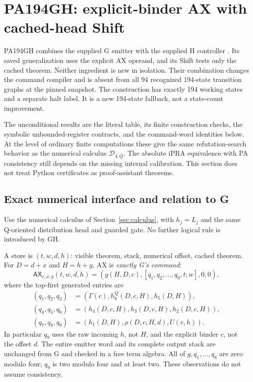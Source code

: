 \section{PA194GH: explicit-binder AX with cached-head Shift}
\label{sec:pa194gh-new}

PA194GH combines the supplied G emitter with the supplied H controller
\cite{generalizer,h-parent}.
Its saved generalization uses the explicit AX operand, and its Shift
tests only the cached theorem. Neither ingredient is new in isolation.
Their combination changes the command compiler and is absent from all
94 recognized 194-state transition graphs at the pinned snapshot.
The construction has exactly 194 working states and a separate halt label.
It is a new 194-state fallback, not a state-count improvement.

The unconditional results are the literal table, its finite construction
checks, the symbolic unbounded-register contracts, and the command-word
identities below. At the level of ordinary finite computations these give
the same refutation-search behavior as the numerical calculus
$\mathcal D_{4,Q}$. The absolute iPRA equivalence with PA consistency
still depends on the missing internal calibration. This section does not
treat Python certificates as proof-assistant theorems.

\subsection{Exact numerical interface and relation to G}

Use the numerical calculus of Section~\ref{sec:calculus}, with $h_j=L_j$ and the same Q-oriented distribution head and guarded gate. No further logical rule is introduced by GH.

A store is $(t,w,d,h)$: visible theorem, stack, numerical offset, cached
theorem. For $D=d+x$ and $H=h+y$, AX is \emph{exactly G's command}:
\[
 \mathsf{AX}_{c,x,y}(t,w,d,h)
       =(g(H,D,c),[q_1,q_2,\ldots,q_9,t;w],0,0),
\]
where the top-first generated entries are
\begin{align*}
 (q_1,q_2,q_3)&=(\Gamma(c),h_6^Q(D,c,H),h_5(D,H)),\\
 (q_4,q_5,q_6)&=(h_4(D,c,H),h_3(D,c,H),h_2(D,c,H)),\\
 (q_7,q_8,q_9)&=(h_1(D,H),\rho(D,c,H,d),U(c,h)).
\end{align*}
In particular $q_9$ uses the raw incoming $h$, not $H$, and the explicit
binder $c$, not the offset $d$. The entire emitter word and its complete
output stack are unchanged from G and checked in a free term algebra.
All of $g,q_1,\ldots,q_8$ are zero modulo four; $q_9$ is two modulo four
and at least two. These observations do not assume consistency.


